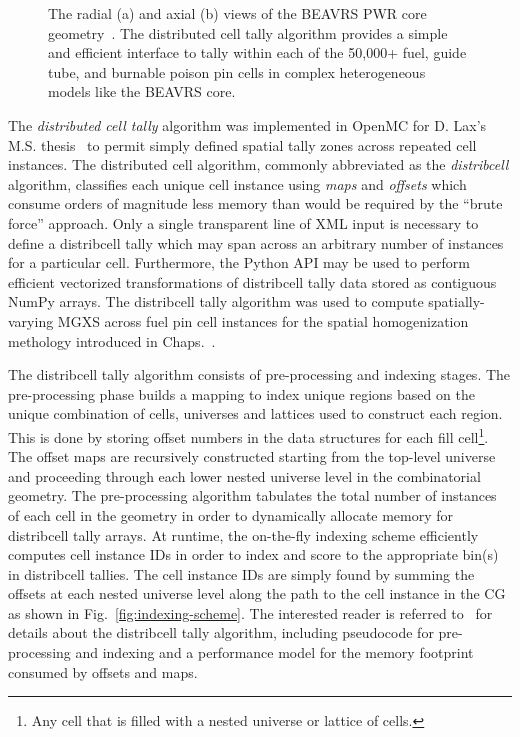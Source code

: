 \begin{figure}[h!]
\begin{subfigure}{0.45\textwidth}
  \caption{}
\end{subfigure}
\caption[Radial and axial views of the BEAVRS core]{The radial (a) and axial (b) views of the BEAVRS \ac{PWR} core geometry~\cite{horelik2013beavrs}. The distributed cell tally algorithm provides a simple and efficient interface to tally within each of the 50,000+ fuel, guide tube, and burnable poison pin cells in complex heterogeneous models like the \ac{BEAVRS} core.}
\label{fig:beavrs}
\end{figure}

The \textit{distributed cell tally} algorithm was implemented in OpenMC for D. Lax's M.S. thesis~\cite{lax2014distribcell} to permit simply defined spatial tally zones across repeated cell instances. The distributed cell algorithm, commonly abbreviated as the \textit{distribcell} algorithm, classifies each unique cell instance using \textit{maps} and \textit{offsets} which consume orders of magnitude less memory than would be required by the ``brute force'' approach. Only a single transparent line of \ac{XML} input is necessary to define a distribcell tally which may span across an arbitrary number of instances for a particular cell. Furthermore, the Python \ac{API} may be used to perform efficient vectorized transformations of distribcell tally data stored as contiguous NumPy arrays. The distribcell tally algorithm was used to compute spatially-varying \ac{MGXS} across fuel pin cell instances for the spatial homogenization methology introduced in Chaps.~.

The distribcell tally algorithm consists of pre-processing and indexing stages. The pre-processing phase builds a mapping to index unique regions based on the unique combination of cells, universes and lattices used to construct each region. This is done by storing offset numbers in the data structures for each fill cell\footnote{Any cell that is filled with a nested universe or lattice of cells.}. The offset maps are recursively constructed starting from the top-level universe and proceeding through each lower nested universe level in the combinatorial geometry. The pre-processing algorithm tabulates the total number of instances of each cell in the geometry in order to dynamically allocate memory for distribcell tally arrays. At runtime, the on-the-fly indexing scheme efficiently computes cell instance IDs in order to index and score to the appropriate bin(s) in distribcell tallies. The cell instance IDs are simply found by summing the offsets at each nested universe level along the path to the cell instance in the \ac{CG} as shown in Fig.~\ref{fig:indexing-scheme}. The interested reader is referred to~\cite{lax2014distribcell} for details about the distribcell tally algorithm, including pseudocode for pre-processing and indexing and a performance model for the memory footprint consumed by offsets and maps.

